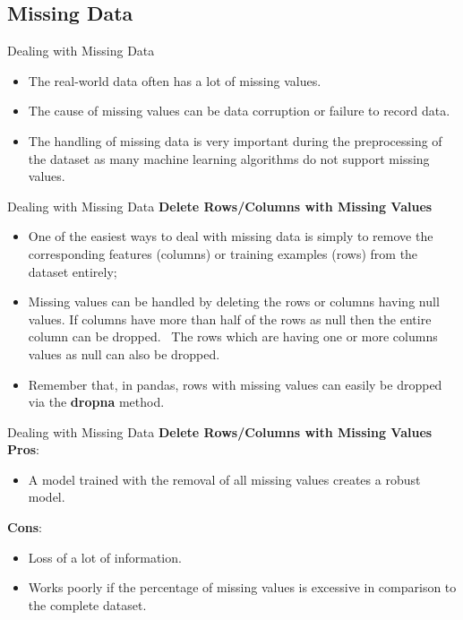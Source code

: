 \documentclass[11pt]{beamer}
\begin{document}
\subsection{Missing Data \\ \scalebox{0.8}{}}
\begin{frame}{Dealing with Missing Data}
	\begin{itemize}
		\item The real-world data often has a lot of missing values. 
		\item The cause of missing values can be data corruption or failure to record data. 
		\item The handling of missing data is very important during the preprocessing of the dataset as many machine learning algorithms do not support missing values.
	\end{itemize}
\end{frame}
\begin{frame}{Dealing with Missing Data}
\textbf{Delete Rows/Columns with Missing Values} 
\begin{itemize}
\item One of the easiest ways to deal with missing data is simply to remove the
corresponding features (columns) or training examples (rows) from the dataset
entirely; 
\item Missing values can be handled by deleting the rows or columns having null values. If columns have more than half of the rows as null then the entire column can be dropped.
\ The rows which are having one or more columns values as null can also be dropped.
\item  Remember that, in pandas, rows with missing values can easily be dropped via the \textbf{dropna} method.
\end{itemize}
\end{frame}
\begin{frame}{Dealing with Missing Data}
\textbf{Delete Rows/Columns with Missing Values} \\
\vspace{0.5cm}
\textbf{Pros}:
\begin{itemize}
\item A model trained with the removal of all missing values creates a robust model.
\end{itemize}
\textbf{Cons}:
\begin{itemize}
\item Loss of a lot of information.
\item Works poorly if the percentage of missing values is excessive in comparison to the complete dataset.
\end{itemize}
\end{frame}
\end{document}
